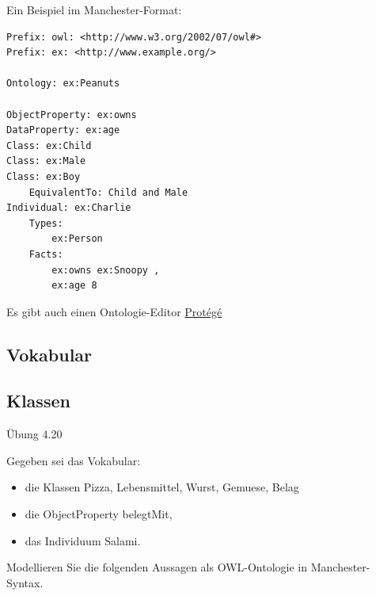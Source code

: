 \documentclass[a4paper]{article}
\begin{document}

Ein Beispiel im Manchester-Format:

\begin{lstlisting}
Prefix: owl: <http://www.w3.org/2002/07/owl#>
Prefix: ex: <http://www.example.org/>

Ontology: ex:Peanuts

ObjectProperty: ex:owns
DataProperty: ex:age
Class: ex:Child
Class: ex:Male
Class: ex:Boy
    EquivalentTo: Child and Male
Individual: ex:Charlie
    Types:
        ex:Person
    Facts:
        ex:owns ex:Snoopy ,
        ex:age 8
\end{lstlisting}

Es gibt auch einen Ontologie-Editor \href{https://protege.stanford.edu/}{Protégé}

\subsection{Vokabular}




\subsection{Klassen}


Übung 4.20 %

Gegeben sei das Vokabular:

\begin{itemize}
    \item die Klassen Pizza, Lebensmittel, Wurst, Gemuese, Belag
    \item die ObjectProperty belegtMit,
    \item das Individuum Salami.
\end{itemize}

Modellieren Sie die folgenden Aussagen als OWL-Ontologie in Manchester-Syntax.
\end{document}
